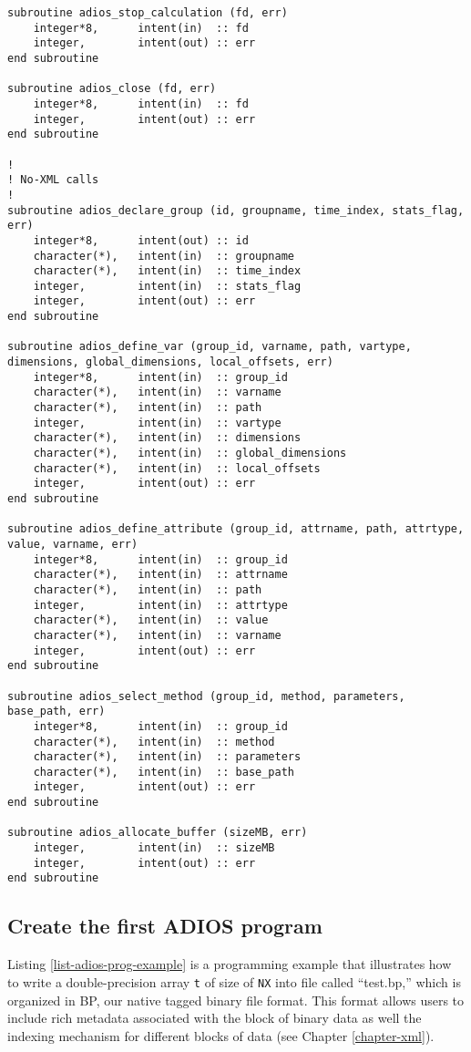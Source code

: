 \begin{lstlisting}[language=ADIOS,alsolanguage=Fortran]
subroutine adios_stop_calculation (fd, err)
    integer*8,      intent(in)  :: fd
    integer,        intent(out) :: err
end subroutine

subroutine adios_close (fd, err)
    integer*8,      intent(in)  :: fd
    integer,        intent(out) :: err
end subroutine

!
! No-XML calls
!
subroutine adios_declare_group (id, groupname, time_index, stats_flag, err)
    integer*8,      intent(out) :: id
    character(*),   intent(in)  :: groupname
    character(*),   intent(in)  :: time_index
    integer,        intent(in)  :: stats_flag
    integer,        intent(out) :: err
end subroutine

subroutine adios_define_var (group_id, varname, path, vartype, dimensions, global_dimensions, local_offsets, err)
    integer*8,      intent(in)  :: group_id
    character(*),   intent(in)  :: varname
    character(*),   intent(in)  :: path
    integer,        intent(in)  :: vartype
    character(*),   intent(in)  :: dimensions
    character(*),   intent(in)  :: global_dimensions
    character(*),   intent(in)  :: local_offsets
    integer,        intent(out) :: err
end subroutine

subroutine adios_define_attribute (group_id, attrname, path, attrtype, value, varname, err)
    integer*8,      intent(in)  :: group_id
    character(*),   intent(in)  :: attrname
    character(*),   intent(in)  :: path
    integer,        intent(in)  :: attrtype
    character(*),   intent(in)  :: value
    character(*),   intent(in)  :: varname
    integer,        intent(out) :: err
end subroutine

subroutine adios_select_method (group_id, method, parameters, base_path, err)
    integer*8,      intent(in)  :: group_id
    character(*),   intent(in)  :: method
    character(*),   intent(in)  :: parameters
    character(*),   intent(in)  :: base_path
    integer,        intent(out) :: err
end subroutine

subroutine adios_allocate_buffer (sizeMB, err)
    integer,        intent(in)  :: sizeMB
    integer,        intent(out) :: err
end subroutine
\end{lstlisting}

\subsection{Create the first ADIOS program}

Listing \ref{list-adios-prog-example} is a programming example that illustrates 
how to write a double-precision 
array \verb+t+ of size of \verb+NX+ into file called ``test.bp,'' 
which is organized in BP, our native tagged binary file format. This format allows 
users to include rich metadata associated with the block of binary data as well 
the indexing mechanism for different blocks of data (see Chapter \ref{chapter-xml}). 

